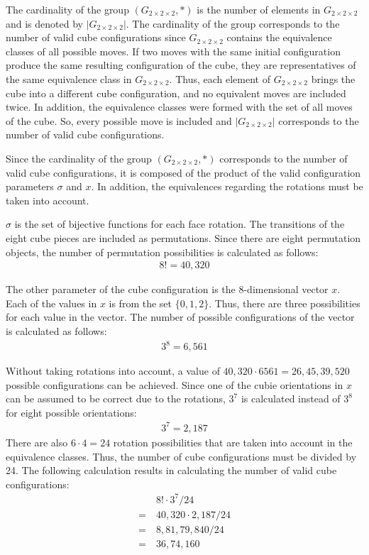 \documentclass[12pt,a4paper]{article}
\theoremstyle{custom}
\newcommand{\Gtwo}{\ensuremath{G_{2\times 2\times 2}}}
\begin{document}
\label{Section_CardinalityOfG}

The cardinality of the group $(G_{2\times 2\times 2},\scriptstyle*)$ is the number of elements in $G_{2\times 2\times 2}$ and is denoted by $|G_{2\times 2\times 2}|$. The cardinality of the group corresponds to the number of valid cube configurations since $G_{2\times 2\times 2}$ contains the equivalence classes of all possible moves. If two moves with the same initial configuration produce the same resulting configuration of the cube, they are representatives of the same equivalence class in $G_{2\times 2\times 2}$. Thus, each element of $G_{2\times 2\times 2}$ brings the cube into a different cube configuration, and no equivalent moves are included twice. In addition, the equivalence classes were formed with the set of all moves of the cube. So, every possible move is included and $|G_{2\times 2\times 2}|$ corresponds to the number of valid cube configurations.


Since the cardinality of the group $\left(\Gtwo,\scriptstyle*\right)$ corresponds to the number of valid cube configurations, it is composed of the product of the valid configuration parameters $\sigma$ and $x$. In addition, the equivalences regarding the rotations must be taken into account.

$\sigma$ is the set of bijective functions for each face rotation. The transitions of the eight cube pieces are included as permutations. Since there are eight permutation objects, the number of permutation possibilities is calculated as follows:
\begin{align*}
8! = 40, 320
\end{align*}

The other parameter of the cube configuration is the 8-dimensional vector $x$. Each of the values in $x$ is from the set $\{0,1,2\}$. Thus, there are three possibilities for each value in the vector. The number of possible configurations of the vector is calculated as follows:
\begin{align*}
3^8 = 6,561
\end{align*}

Without taking rotations into account, a value of $40, 320 \cdot 6561 = 26,45,39,520$ possible configurations can be achieved.
Since one of the cubie orientations in $x$ can be assumed to be correct due to the rotations, $3^7$ is calculated instead of $3^8$ for eight possible orientations:
\begin{align*}
3^7 = 2, 187
\end{align*}
There are also $6 \cdot 4 = 24$ rotation possibilities that are taken into account in the equivalence classes. %
Thus, the number of cube configurations must be divided by 24. The following calculation results in calculating the number of valid cube configurations:
\begin{align*}
& 8! \cdot 3^7 / 24 \\
= \ & 40 , 320 \cdot 2 , 187 / 24 \\
= \ & 8,8  1,79 , 840 / 24 \\
= \ & 3 6,74, 160
\end{align*}
\end{document}
